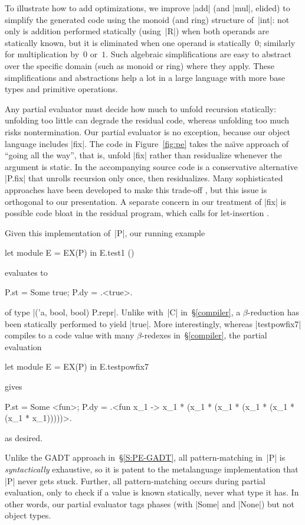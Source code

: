 \documentclass[preprint]{sigplanconf}
\begin{document}
To illustrate how to add optimizations, we improve |add| (and |mul|,
elided) to simplify the generated code using the monoid (and ring)
structure of~|int|: not only is addition performed statically
(using~|R|) when both operands are statically known, but it is
eliminated when one operand is statically~$0$; similarly for
multiplication by~$0$ or~$1$.  Such algebraic simplifications are easy
to abstract over the specific domain (such as monoid or ring) where they
apply.  These simplifications and abstractions help a lot in a large
language with more base types and primitive operations.

Any partial evaluator must decide how much to unfold recursion
statically: unfolding too little can degrade the residual code, whereas
unfolding too much risks nontermination.  Our partial evaluator is no
exception, because our object language includes |fix|.  The code in
Figure~\ref{fig:pe} takes the na\"\i ve approach of ``going all the
way'', that is, unfold |fix| rather than residualize whenever the
argument is static.  In the accompanying source code is a conservative
alternative |P.fix| that unrolls recursion only once, then residualizes.
Many sophisticated approaches have been developed to make this trade-off
\citep{jones-partial}, but this issue is orthogonal to our presentation.
A separate concern in our treatment of |fix| is possible code bloat in
the residual program, which calls for let-insertion
\citep{SwadiTahaKiselyovPasalic2006}.

Given this implementation of~|P|, our running example
\begin{code}
let module E = EX(P) in E.test1 ()
\end{code}
evaluates to
\begin{code}
{P.st = Some true; P.dy = .<true>.}
\end{code}
of type |('a, bool, bool) P.repr|.  Unlike with~|C| in~\S\ref{compiler},
a $\beta$-reduction has been statically performed to yield |true|.  More
interestingly, whereas |testpowfix7| compiles to a code value with many
$\beta$-redexes in~\S\ref{compiler}, the partial evaluation
\begin{code}
let module E = EX(P) in E.testpowfix7
\end{code}
gives
\begin{code}
{P.st = Some <fun>;
 P.dy = .<fun x_1 -> x_1 * (x_1 * (x_1 * (x_1 *
                    (x_1 * (x_1 * x_1)))))>.}
\end{code}
as desired.

Unlike the GADT approach in~\S\ref{S:PE-GADT}, all pattern\hyp matching
in~|P| is \emph{syntactically} exhaustive, so it is patent to the metalanguage
implementation that |P| never gets stuck.  Further, all pattern\hyp matching occurs
during partial evaluation, only to check if a value is known statically,
never what type it has.  In other words, our partial evaluator tags
phases (with |Some| and |None|) but not object types.
\end{document}
